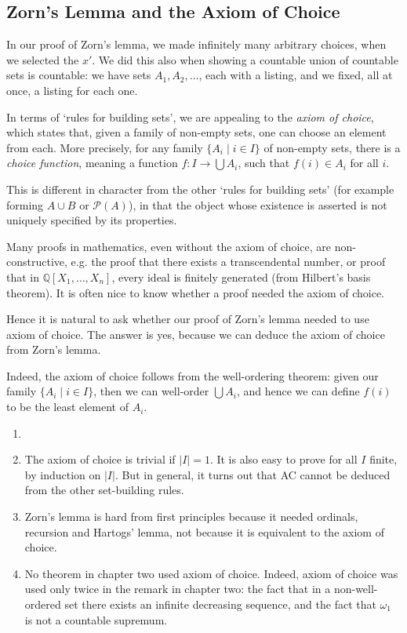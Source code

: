 \documentclass[12pt]{article}
\begin{document}
\subsection{Zorn's Lemma and the Axiom of Choice}
\label{sub:zorns_lemma_and_the_axiom_of_choice}

In our proof of Zorn's lemma, we made infinitely many arbitrary choices, when we selected the $x'$. We did this also when showing a countable union of countable sets is countable: we have sets $A_1, A_2, \ldots$, each with a listing, and we fixed, all at once, a listing for each one.

In terms of `rules for building sets', we are appealing to the \emph{axiom of choice}, which states that, given a family of non-empty sets, one can choose an element from each. More precisely, for any family $\{A_i \mid i \in I\}$ of non-empty sets, there is a \emph{choice function}, meaning a function $f : I \to \bigcup A_i$, such that $f(i) \in A_i$ for all $i$.

This is different in character from the other `rules for building sets' (for example forming $A \cup B$ or $\mathcal{P}(A)$), in that the object whose existence is asserted is not uniquely specified by its properties.

Many proofs in mathematics, even without the axiom of choice, are non-constructive, e.g. the proof that there exists a transcendental number, or proof that in $\mathbb{Q}[X_1, \ldots, X_n]$, every ideal is finitely generated (from Hilbert's basis theorem). It is often nice to know whether a proof needed the axiom of choice.

Hence it is natural to ask whether our proof of Zorn's lemma needed to use axiom of choice. The answer is yes, because we can deduce the axiom of choice from Zorn's lemma.

Indeed, the axiom of choice follows from the well-ordering theorem: given our family $\{A_i \mid i \in I\}$, then we can well-order $\bigcup A_i$, and hence we can define $f(i)$ to be the least element of $A_i$.

\begin{remark}
	\begin{enumerate}
		\item[]
		\item The axiom of choice is trivial if $|I| = 1$. It is also easy to prove for all $I$ finite, by induction on $|I|$. But in general, it turns out that AC cannot be deduced from the other set-building rules.
		\item Zorn's lemma is hard from first principles because it needed ordinals, recursion and Hartogs' lemma, not because it is equivalent to the axiom of choice.
		\item No theorem in chapter two used axiom of choice. Indeed, axiom of choice was used only twice in the remark in chapter two: the fact that in a non-well-ordered set there exists an infinite decreasing sequence, and the fact that $\omega_1$ is not a countable supremum.
	\end{enumerate}
\end{remark}
\end{document}
